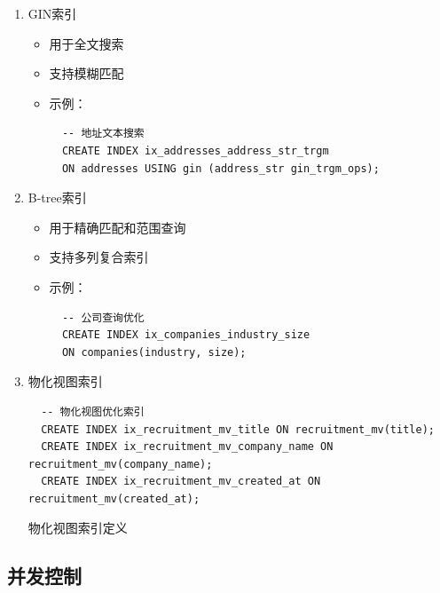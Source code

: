   \begin{enumerate}
    \item GIN索引
    \begin{itemize}
      \item 用于全文搜索
      \item 支持模糊匹配
      \item 示例：
      \begin{verbatim}
  -- 地址文本搜索
  CREATE INDEX ix_addresses_address_str_trgm 
  ON addresses USING gin (address_str gin_trgm_ops);
      \end{verbatim}
    \end{itemize}
  
    \item B-tree索引
    \begin{itemize}
      \item 用于精确匹配和范围查询
      \item 支持多列复合索引
      \item 示例：
      \begin{verbatim}
  -- 公司查询优化
  CREATE INDEX ix_companies_industry_size 
  ON companies(industry, size);
      \end{verbatim}
    \end{itemize}
  
    \item 物化视图索引
    \begin{listing}[htbp]
      \begin{verbatim}
  -- 物化视图优化索引
  CREATE INDEX ix_recruitment_mv_title ON recruitment_mv(title);
  CREATE INDEX ix_recruitment_mv_company_name ON recruitment_mv(company_name);
  CREATE INDEX ix_recruitment_mv_created_at ON recruitment_mv(created_at);
      \end{verbatim}
      \caption{物化视图索引定义}\label{lst:materialized_view_indexes}
    \end{listing}
  \end{enumerate}
  
  \subsection{并发控制}
  
